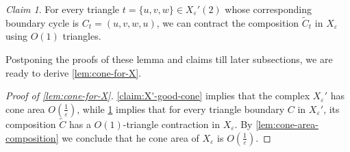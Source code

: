 \documentclass[10pt,a4paper]{article}
\newcommand{\prettyref}[1]{\cref{#1}}
\newtheorem{proposition}[theorem]{Proposition}
\theoremstyle{definition}
\theoremstyle{remark}
\newtheorem{claim}[theorem]{Claim}
\newcommand{\Authornotecolored}[3]{{\sffamily\small\color{#1}{[#2: #3]}}}
\newcommand{\Authornotecolored}[3]{}
\newcommand{\Snote}{\Authornotecolored{Green}{S}}
\newcommand{\snote}{\Snote}
\newcommand{\set}[1]{\{#1\}}
\numberwithin{equation}{section}
\let\pref=\prettyref
\begin{document}
\begin{claim}\label{claim:contract-X'(2)}
    For every triangle \(t=\set{u,v,w} \in X_\varepsilon'(2)\) whose corresponding boundary cycle is \(C_t=(u,v,w,u)\), we can contract the composition \(\tilde{C}_t\) in $X_\varepsilon$ using \(O(1)\) triangles.
\end{claim}

Postponing the proofs of these lemma and claims till later subsections, we are ready to derive \pref{lem:cone-for-X}. 

\begin{proof}[Proof of \pref{lem:cone-for-X}]
    \pref{claim:X'-good-cone} implies that the complex $X_\varepsilon'$ has cone area $O(\frac{1}{\varepsilon})$, while \pref{claim:contract-X'(2)} implies that for every triangle boundary $C$ in $X_\varepsilon'$, its composition $\tilde{C}$ has a $O(1)$-triangle contraction in $X_\varepsilon$. By  \pref{lem:cone-area-composition} we conclude that he cone area of $X_\varepsilon$ is $O(\frac{1}{\varepsilon})$.
\end{proof}




%
\end{document}
